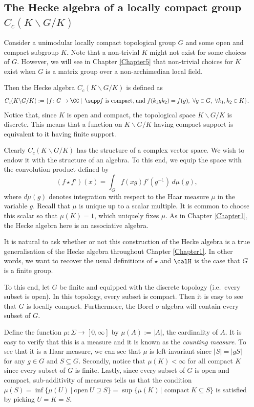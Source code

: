 \documentclass[11pt]{amsart}
\theoremstyle{remark}
\begin{document}

\subsection{The Hecke algebra of a locally compact group $C_c(K\backslash G/K)$}\label{Section4.2}
Consider a unimodular locally compact topological group $G$ and some open and compact subgroup $K$.
Note that a non-trivial $K$ might not exist for some choices of $G$.
However, we will see in Chapter \ref{Chapter5} that non-trivial choices for $K$ exist when $G$ is a matrix group over a non-archimedian local field.

Then the Hecke algebra $C_c(K\backslash G/K)$ is defined as
\[
	C_c(K\backslash G/K) := \{f\colon G\to\CC\ |\ \supp f\ \text{is compact, and}\ f(k_1gk_2) = f(g),\ \forall g\in G,\ \forall k_1,k_2\in K\}.
\]
Notice that, since $K$ is open and compact, the topological space $K\backslash G/K$ is discrete.
This means that a function on $K\backslash G/K$ having compact support is equivalent to it having finite support.

Clearly $C_c(K\backslash G/K)$ has the structure of a complex vector space.
We wish to endow it with the structure of an algebra.
To this end, we equip the space with the convolution product defined by
\[
	(f\star f')(x) = \int_G f(xg)f'(g^{-1})\ d\mu(g),
\]
where $d\mu(g)$ denotes integration with respect to the Haar measure $\mu$ in the variable $g$.
Recall that $\mu$ is unique up to a scalar multiple.
It is common to choose this scalar so that $\mu(K)=1$, which uniquely fixes $\mu$.
As in Chapter \ref{Chapter1}, the Hecke algebra here is an associative algebra.

It is natural to ask whether or not this construction of the Hecke algebra is a true generalisation of the Hecke algebra throughout Chapter \ref{Chapter1}.
In other words, we want to recover the usual definitions of $\star$ and $\calH$ is the case that $G$ is a finite group.

To this end, let $G$ be finite and equipped with the discrete topology (i.e.\ every subset is open).
In this topology, every subset is compact.
Then it is easy to see that $G$ is locally compact.
Furthermore, the Borel $\sigma$-algebra will contain every subset of $G$.

Define the function $\mu\colon \Sigma\to[0,\infty]$ by $\mu(A) := |A|$, the cardinality of $A$.
It is easy to verify that this is a measure and it is known as the \emph{counting measure}.
To see that it is a Haar measure, we can see that $\mu$ is left-invariant since $|S|=|gS|$ for any $g\in G$ and $S\subseteq G$.
Secondly, notice that $\mu(K)<\infty$ for all compact $K$ since every subset of $G$ is finite.
Lastly, since every subset of $G$ is open and compact, sub-additivity of measures tells us that the condition $\mu(S) = \inf\{\mu(U)\ |\ \text{open}\ U\supseteq S\} = \sup\{\mu(K)\ |\ \text{compact}\ K\subseteq S\}$ is satisfied by picking $U=K=S$.
\end{document}
